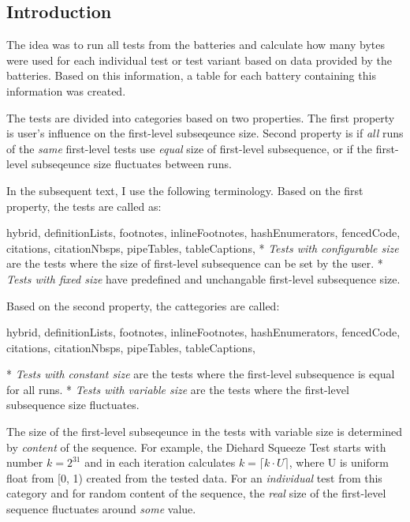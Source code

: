 \documentclass[
  digital,     %
  oneside,     %
  nosansbold,  %
  nocolorbold, %
  nolof,         %
  nolot,         %
]{fithesis4}
\begin{document}
\subsection{Introduction} \label{chap:analysis-data-intro}

The idea was to run all tests from the batteries and calculate how many bytes were used for each individual test or test variant based on data provided by the batteries. Based on this information, a table for each battery containing this information was created.

The tests are divided into categories based on two properties. The first property is user's influence on the first-level subseqeunce size. Second property is if \emph{all} runs of the \emph{same} first-level tests use \emph{equal} size of first-level subsequence, or if the first-level subseqeunce size fluctuates between runs. 

In the subsequent text, I use the following terminology. Based on the first property, the tests are called as:
\begin{markdown*}{%
  hybrid,
  definitionLists,
  footnotes,
  inlineFootnotes,
  hashEnumerators,
  fencedCode,
  citations,
  citationNbsps,
  pipeTables,
  tableCaptions,
}
* \emph{Tests with configurable size} are the tests where the size of first-level subsequence can be set by the user.
* \emph{Tests with fixed size} have predefined and unchangable first-level subsequence size.
\end{markdown*}
Based on the second property, the cattegories are called:
\begin{markdown*}{%
  hybrid,
  definitionLists,
  footnotes,
  inlineFootnotes,
  hashEnumerators,
  fencedCode,
  citations,
  citationNbsps,
  pipeTables,
  tableCaptions,
}

* \emph{Tests with constant size} are the tests where the first-level subsequence is equal for all runs.
* \emph{Tests with variable size} are the tests where the first-level subsequence size fluctuates.

\end{markdown*}

The size of the first-level subseqeunce in the tests with variable size is determined by \emph{content} of the sequence. For example, the Diehard Squeeze Test starts with number $k=2^{31}$ and in each iteration calculates $k=\lceil k\cdot U \rceil $, where U is uniform float from [0, 1) created from the tested data. For an \emph{individual} test from this category and for random content of the sequence, the \emph{real} size of the first-level sequence fluctuates around \emph{some} value. 
\end{document}
